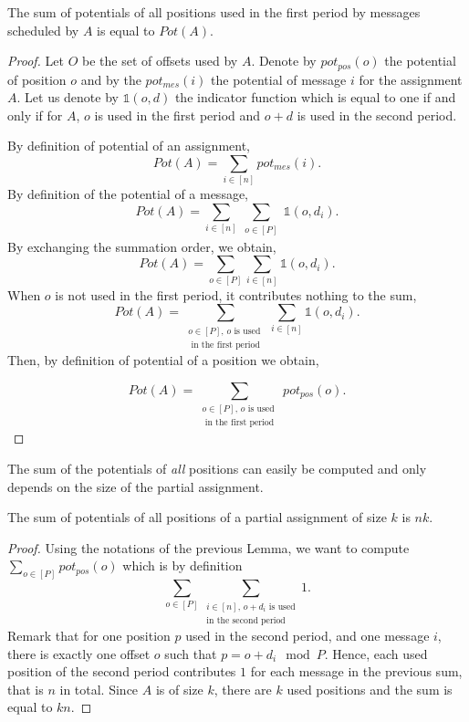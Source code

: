 \documentclass[a4paper,UKenglish,cleveref, autoref, thm-restate]{lipics-v2019}
\begin{document}
\begin{lemma}\label{lemma:pot_pos}
The sum of potentials of all positions used in the first period by messages scheduled by $A$ is equal to $Pot(A)$.  
\end{lemma}
\begin{proof}
Let $O$ be the set of offsets used by $A$. Denote by $pot_{pos}(o)$ the potential of position $o$ and by the $pot_{mes}(i)$ the potential
of message $i$ for the assignment $A$. Let us denote by $\mathbb{1}(o,d)$ the indicator function which is equal to one if and only if for $A$,
$o$ is used in the first period and $o+d$ is used in the second period.

By definition of potential of an assignment, $$Pot(A) = \sum_{i \in [n]} pot_{mes}(i).$$
By definition of the potential of a message, 
$$\displaystyle{Pot(A) = \sum_{i \in [n]} \sum_{\substack{o \in [P]}} \mathbb{1}(o,d_i) }.$$
By exchanging the summation order, we obtain,
$$\displaystyle{Pot(A) = \sum_{o \in [P] }\sum_{i \in [n]} \mathbb{1}(o,d_i) }.$$
When $o$ is not used in the first period, it contributes nothing to the sum,
$$\displaystyle{Pot(A) = \sum_{\substack{o \in [P],\, o \text{ is used }\\ \text{ in the first period } } }\sum_{i \in [n]} \mathbb{1}(o,d_i) }.$$
Then, by definition of potential of a position we obtain,

$$\displaystyle{Pot(A) = \sum_{\substack{o \in [P],\, o \text{ is used }\\ \text{ in the first period } } } pot_{pos}(o)}.$$
\end{proof}

The sum of the potentials of \emph{all} positions can easily be computed and only depends on the size of the partial assignment.

\begin{lemma}\label{lemma:inv}
The sum of potentials of all positions of a partial assignment of size $k$ is $nk$.  
\end{lemma}
\begin{proof}
Using the notations of the previous Lemma, we want to compute $\sum_{o \in [P]} pot_{pos}(o)$ which is by definition
$$\sum_{o \in [P]} \sum_{\substack {i \in [n],\, o + d_i \text{ is used} \\ \text{in the second period}}} 1.$$
Remark that for one position $p$ used in the second period, and one message $i$, there is exactly one offset $o$ such that $p = o+d_i \mod P$.
Hence, each used position of the second period contributes $1$ for each message in the previous sum, that is $n$ in total.
Since $A$ is of size $k$, there are $k$ used positions and the sum is equal to $kn$.
\end{proof}
\end{document}
